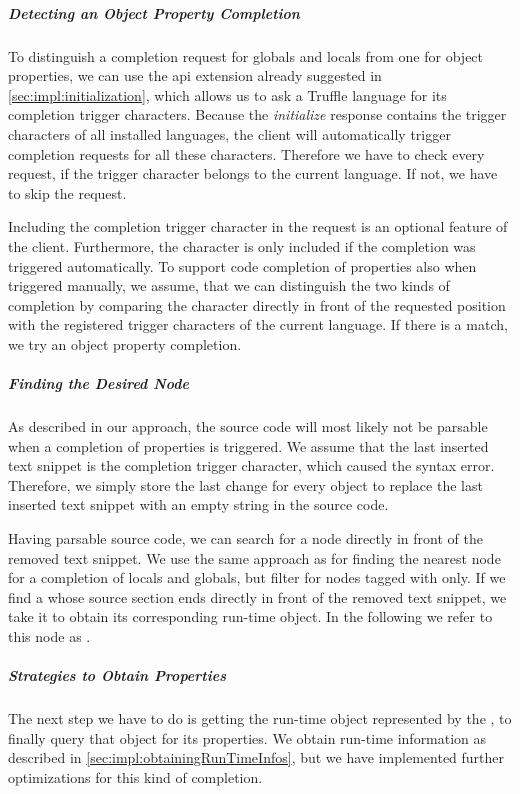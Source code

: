     \subparagraph{Detecting an Object Property Completion}
    To distinguish a completion request for globals and locals from one for object properties, we can use the \ac{api} extension already suggested in \autoref{sec:impl:initialization}, which allows us to ask a Truffle language for its completion trigger characters. Because the \emph{initialize} response contains the trigger characters of all installed languages, the client will automatically trigger completion requests for all these characters. Therefore we have to check every request, if the trigger character belongs to the current language. If not, we have to skip the request.

    Including the completion trigger character in the request is an optional feature of the client. Furthermore, the character is only included if the completion was triggered automatically. To support code completion of properties also when triggered manually, we assume, that we can distinguish the two kinds of completion by comparing the character directly in front of the requested position with the registered trigger characters of the current language. If there is a match, we try an object property completion.

    \subparagraph{Finding the Desired Node}
    As described in our approach, the source code will most likely not be parsable when a completion of properties is triggered. We assume that the last inserted text snippet is the completion trigger character, which caused the syntax error. Therefore, we simply store the last change for every  object to replace the last inserted text snippet with an empty string in the source code.

    Having parsable source code, we can search for a node directly in front of the removed text snippet. We use the same approach as for finding the nearest node for a completion of locals and globals, but filter for nodes tagged with  only. If we find a  whose source section ends directly in front of the removed text snippet, we take it to obtain its corresponding run-time object. In the following we refer to this node as .

    \subparagraph{Strategies to Obtain Properties}
    The next step we have to do is getting the run-time object represented by the , to finally query that object for its properties. We obtain run-time information as described in \autoref{sec:impl:obtainingRunTimeInfos}, but we have implemented further optimizations for this kind of completion.

